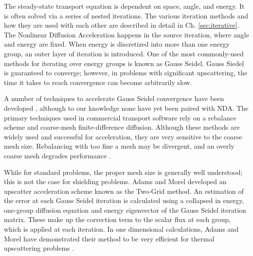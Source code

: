 The steady-state transport equation is dependent on space, angle, and energy. It is often solved via a series of nested iterations. The various iteration methods and how they are used with each other are described in detail in Ch. \ref{sec:iterative}. The Nonlinear Diffusion Acceleration happens in the source iteration, where angle and energy are fixed. When energy is discretized into more than one energy group, an outer layer of iteration is introduced. One of the most commonly-used methods for iterating over energy groups is known as Gauss Seidel. Gauss Siedel is guaranteed to converge; however, in problems with significant upscattering, the time it takes to reach convergence can become arbitrarily slow. 

A number of techniques to accelerate Gauss Seidel convergence have been developed \cite{morel-upscat} \cite{evans-upscat}, although to our knowledge none have yet been paired with NDA. The primary techniques used in commercial transport software rely on a rebalance scheme and coarse-mesh finite-difference diffusion.
Although these methods are widely used and successful for acceleration, they are very sensitive to the coarse mesh size. Rebalancing with too fine a mesh may be divergent, and an overly coarse mesh degrades performance \cite{evans-upscat}.

While for standard problems, the proper mesh size is generally well understood;
 this is not the case for shielding problems. Adams and Morel developed an upscatter acceleration scheme known as the Two-Grid method. An estimation of the error at each Gauss Seidel iteration is calculated using a collapsed in energy, one-group diffusion equation and energy eigenvector of the Gauss Seidel iteration matrix. These
  make up the correction term to the scalar flux at each group, which is applied at each iteration. In one dimensional calculations, Adams and Morel have demonstrated their method to be very efficient for thermal upscattering problems \cite{morel-upscat}.


